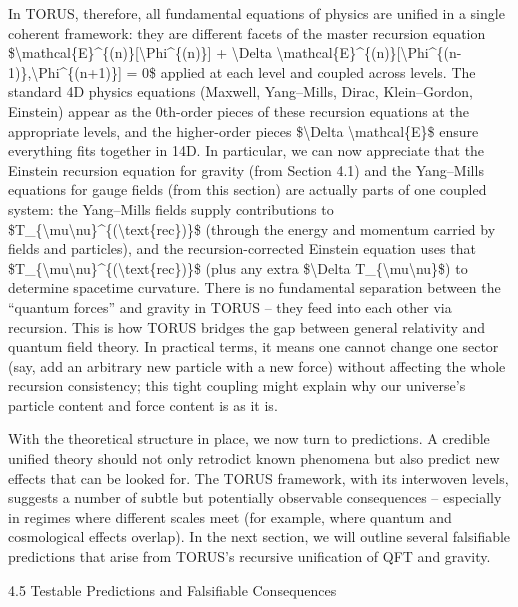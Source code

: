 \documentclass[]{article}
\begin{document}
In TORUS, therefore, all fundamental equations of physics are unified in
a single coherent framework: they are different facets of the master
recursion equation
\$\textbackslash{}mathcal\{E\}\^{}\{(n)\}{[}\textbackslash{}Phi\^{}\{(n)\}{]}
+ \textbackslash{}Delta
\textbackslash{}mathcal\{E\}\^{}\{(n)\}{[}\textbackslash{}Phi\^{}\{(n-1)\},\textbackslash{}Phi\^{}\{(n+1)\}{]}
= 0\$ applied at each level and coupled across levels. The standard 4D
physics equations (Maxwell, Yang--Mills, Dirac, Klein--Gordon, Einstein)
appear as the 0th-order pieces of these recursion equations at the
appropriate levels, and the higher-order pieces \$\textbackslash{}Delta
\textbackslash{}mathcal\{E\}\$ ensure everything fits together in 14D.
In particular, we can now appreciate that the Einstein recursion
equation for gravity (from Section 4.1) and the Yang--Mills equations
for gauge fields (from this section) are actually parts of one coupled
system: the Yang--Mills fields supply contributions to
\$T\_\{\textbackslash{}mu\textbackslash{}nu\}\^{}\{(\textbackslash{}text\{rec\})\}\$
(through the energy and momentum carried by fields and particles), and
the recursion-corrected Einstein equation uses that
\$T\_\{\textbackslash{}mu\textbackslash{}nu\}\^{}\{(\textbackslash{}text\{rec\})\}\$
(plus any extra \$\textbackslash{}Delta
T\_\{\textbackslash{}mu\textbackslash{}nu\}\$) to determine spacetime
curvature. There is no fundamental separation between the ``quantum
forces'' and gravity in TORUS -- they feed into each other via
recursion. This is how TORUS bridges the gap between general relativity
and quantum field theory. In practical terms, it means one cannot change
one sector (say, add an arbitrary new particle with a new force) without
affecting the whole recursion consistency; this tight coupling might
explain why our universe's particle content and force content is as it
is.

With the theoretical structure in place, we now turn to predictions. A
credible unified theory should not only retrodict known phenomena but
also predict new effects that can be looked for. The TORUS framework,
with its interwoven levels, suggests a number of subtle but potentially
observable consequences -- especially in regimes where different scales
meet (for example, where quantum and cosmological effects overlap). In
the next section, we will outline several falsifiable predictions that
arise from TORUS's recursive unification of QFT and gravity.

4.5 Testable Predictions and Falsifiable Consequences
\end{document}
